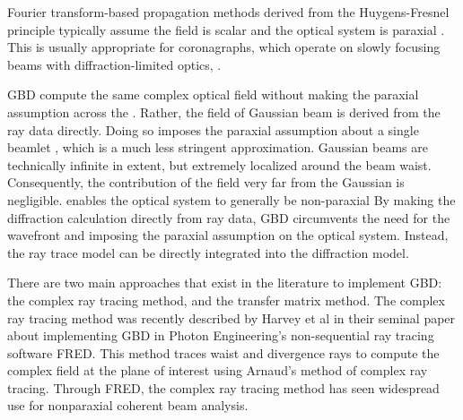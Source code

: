  Fourier transform-based propagation methods derived from the Huygens-Fresnel principle typically assume the field is scalar and the optical system is paraxial \cite{goodman17}. This is usually appropriate for  coronagraphs, which operate on slowly focusing beams with diffraction-limited optics, . 

GBD  compute the same complex optical field without making the paraxial assumption across the . Rather, the  field of  Gaussian beam is derived from the ray data directly. Doing so imposes the paraxial assumption about a single beamlet , which is a much less stringent approximation. Gaussian beams are technically infinite in extent, but extremely localized around the beam waist. Consequently, the contribution of the field very far from the Gaussian is negligible.  enables the  optical system to generally be non-paraxial By making the diffraction calculation directly from ray data, GBD circumvents the need for  the wavefront  and imposing the paraxial assumption on the optical system. Instead, the ray trace model can be directly integrated into the diffraction model. 

There are two main approaches that exist in the literature to implement GBD: the complex ray tracing method, and the transfer matrix method. The complex ray tracing method was recently described by Harvey et al\cite{Harvey15} in their seminal paper about implementing GBD in Photon Engineering's non-sequential ray tracing software FRED. This method traces waist and divergence rays to compute the complex field at the plane of interest using Arnaud's method of complex ray tracing\cite{arnaud_representation_1985,Greynolds86}. Through FRED, the complex ray tracing method has seen widespread use for nonparaxial coherent beam analysis.


